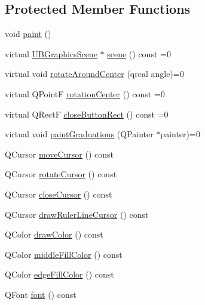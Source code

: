 \subsection*{Protected Member Functions}
\begin{DoxyCompactItemize}
\item 
void \hyperlink{class_u_b_abstract_draw_ruler_ad8f49aa56a8dc14fb727f64f718a2ea2}{paint} ()
\item 
virtual \hyperlink{class_u_b_graphics_scene}{U\-B\-Graphics\-Scene} $\ast$ \hyperlink{class_u_b_abstract_draw_ruler_a1b2bb6a8be6859a02c890d110d4be888}{scene} () const =0
\item 
virtual void \hyperlink{class_u_b_abstract_draw_ruler_a2669a909cd1260a392fef3606daa11be}{rotate\-Around\-Center} (qreal angle)=0
\item 
virtual Q\-Point\-F \hyperlink{class_u_b_abstract_draw_ruler_a718ca9bb91acddcb77982ed343eb6703}{rotation\-Center} () const =0
\item 
virtual Q\-Rect\-F \hyperlink{class_u_b_abstract_draw_ruler_a5398312ddd84af7dc66e18b4cb37a3fa}{close\-Button\-Rect} () const =0
\item 
virtual void \hyperlink{class_u_b_abstract_draw_ruler_a7d5c1375ce4433c8abbe4b0e7781d065}{paint\-Graduations} (Q\-Painter $\ast$painter)=0
\item 
Q\-Cursor \hyperlink{class_u_b_abstract_draw_ruler_a939bc34552522d258e2b7fd62bc44b8e}{move\-Cursor} () const 
\item 
Q\-Cursor \hyperlink{class_u_b_abstract_draw_ruler_a9ccae35c7d0e3b26f817ed62097ce75f}{rotate\-Cursor} () const 
\item 
Q\-Cursor \hyperlink{class_u_b_abstract_draw_ruler_aebc94db267320062fde4a3e2deaa781b}{close\-Cursor} () const 
\item 
Q\-Cursor \hyperlink{class_u_b_abstract_draw_ruler_add025983828cc0c47fb21046397a0f7c}{draw\-Ruler\-Line\-Cursor} () const 
\item 
Q\-Color \hyperlink{class_u_b_abstract_draw_ruler_af1700f03c5581a7619a96eb90fcc9709}{draw\-Color} () const 
\item 
Q\-Color \hyperlink{class_u_b_abstract_draw_ruler_a36041ae344dcd157fb3b96f8ade6bdc5}{middle\-Fill\-Color} () const 
\item 
Q\-Color \hyperlink{class_u_b_abstract_draw_ruler_a5e31d81ff314da040fbdb744ebad5473}{edge\-Fill\-Color} () const 
\item 
Q\-Font \hyperlink{class_u_b_abstract_draw_ruler_aa2d644906d0527ecd64ef9d8aceed6c4}{font} () const 
\end{DoxyCompactItemize}
